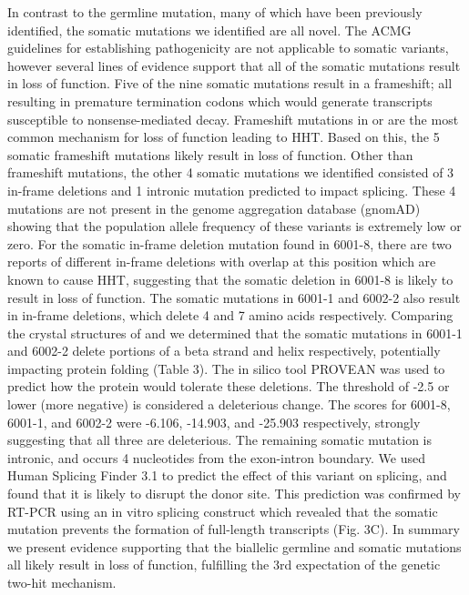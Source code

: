 In contrast to the germline mutation, many of which have been previously identified, the somatic mutations we identified are all novel. The ACMG guidelines for establishing pathogenicity are not applicable to somatic variants, however several lines of evidence support that all of the somatic mutations result in loss of function. Five of the nine somatic mutations result in a frameshift; all resulting in premature termination codons which would generate transcripts susceptible to nonsense-mediated decay. Frameshift mutations in  or  are the most common mechanism for loss of function leading to HHT. Based on this, the 5 somatic frameshift mutations likely result in loss of function. Other than frameshift mutations, the other 4 somatic mutations we identified consisted of 3 in-frame deletions and 1 intronic mutation predicted to impact splicing. These 4 mutations are not present in the genome aggregation database (gnomAD) showing that the population allele frequency of these variants is extremely low or zero. For the somatic in-frame deletion mutation found in 6001-8, there are two reports of different in-frame deletions with overlap at this position which are known to cause HHT, suggesting that the somatic deletion in 6001-8 is likely to result in loss of function. The somatic mutations in 6001-1 and 6002-2 also result in in-frame deletions, which delete 4 and 7 amino acids respectively. Comparing the crystal structures of  and  we determined that the somatic mutations in 6001-1 and 6002-2 delete portions of a beta strand and helix respectively, potentially impacting protein folding (Table 3). The in silico tool PROVEAN was used to predict how the protein would tolerate these deletions.   The threshold of -2.5 or lower (more negative) is considered a deleterious change. The scores for 6001-8, 6001-1, and 6002-2 were -6.106, -14.903, and -25.903 respectively, strongly suggesting that all three are deleterious. The remaining somatic mutation is intronic, and occurs 4 nucleotides from the exon-intron boundary. We used Human Splicing Finder 3.1 to predict the effect of this variant on splicing, and found that it is likely to disrupt the donor site. This prediction was confirmed by RT-PCR using an in vitro splicing construct which revealed that the somatic mutation prevents the formation of full-length  transcripts (Fig. 3C). In summary we present evidence supporting that the biallelic germline and somatic mutations all likely result in loss of function, fulfilling the 3rd expectation of the genetic two-hit mechanism. 

